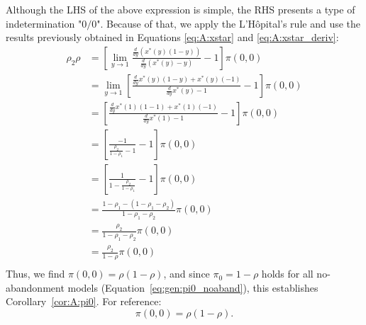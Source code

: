     Although the LHS of the above expression is simple, the RHS presents a type of indetermination "$0/0$". Because of that, we apply the L'Hôpital's rule and use the results previously obtained in Equations \eqref{eq:A:xstar} and \eqref{eq:A:xstar_deriv}:
    \begin{align*}
        \rho_2 \rho
        &=\left[
            \lim_{y\to1} \frac{\frac{d}{dy}(x^*(y)(1-y))}{\frac{d}{dy}(x^*(y)-y)}
            - 1
        \right] \pi(0,0) \\
        &= \lim_{y\to1} \left[
            \frac{
                \frac{d}{dy} x^*(y)(1-y) + x^*(y) (-1) 
            }{
                 \frac{d}{dy} x^*(y) - 1
            }
            -1
            \right]
        \pi(0,0)\\
        &= \left[ 
            \frac{
                \frac{d}{dy} x^*(1)(1-1) + x^*(1) (-1) 
            }{
                 \frac{d}{dy} x^*(1) - 1
            }
            - 1
            \right]
        \pi(0,0)\\
        &= \left[ 
            \frac{
                - 1
            }{
                \frac{\rho_2}{1-\rho_1} - 1
            }
            - 1
            \right]
        \pi(0,0)\\
        &= \left[ \frac{1}{1 - \frac{\rho_2}{1-\rho_1}} -1 \right] \pi(0,0) \\
        &= \frac{1-\rho_1 - (1 - \rho_1 - \rho_2)}{1 - \rho_1 - \rho_2} \pi(0,0) \\
        &= \frac{\rho_2}{1 - \rho_1 - \rho_2} \pi(0,0)\\
        &= \frac{\rho_2}{1 - \rho} \pi(0,0) \\
    \end{align*}
    Thus, we find $\pi(0,0) = \rho(1-\rho)$, and since $\pi_0 = 1-\rho$ holds for all no-abandonment models (Equation~\eqref{eq:gen:pi0_noaband}), this establishes Corollary~\ref{cor:A:pi0}. For reference:
    \begin{equation}
        \pi(0,0) = \rho (1-\rho). \label{eq:A:pi00}
    \end{equation}
